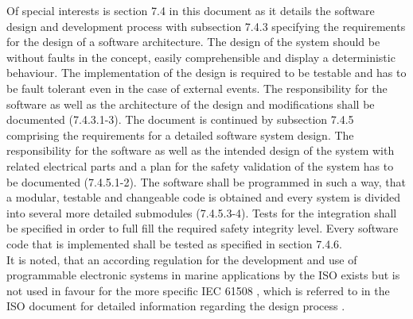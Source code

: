  Of special interests is section 7.4 in this document as it details the software design and development process with subsection 7.4.3 specifying the requirements for the design of a software architecture. The design of the system should be without faults in the concept, easily comprehensible and display a deterministic behaviour. The implementation of the design is required to be testable and has to be fault tolerant even in the case of external events. The responsibility for the software as well as the architecture of the design and modifications shall be documented (7.4.3.1-3). The document is continued by subsection 7.4.5 comprising the requirements for a detailed software system design. The responsibility for the software as well as the intended design of the system with related electrical parts and a plan for the safety validation of the system has to be documented (7.4.5.1-2). The software shall be programmed in such a way, that a modular, testable and changeable code is obtained and every system is divided into several more detailed submodules (7.4.5.3-4). Tests for the integration shall be specified in order to full fill the required safety integrity level. Every software code that is implemented shall be tested as specified in section 7.4.6.\\
  
 It is noted, that an according regulation for the development and use of programmable electronic systems in marine applications \cite{ISO} by the \ac{ISO} exists but is not used in favour for the more specific \ac{IEC} 61508 , which is referred to in the \ac{ISO} document for detailed information regarding the design process \cite{LearningAuto}.
 

